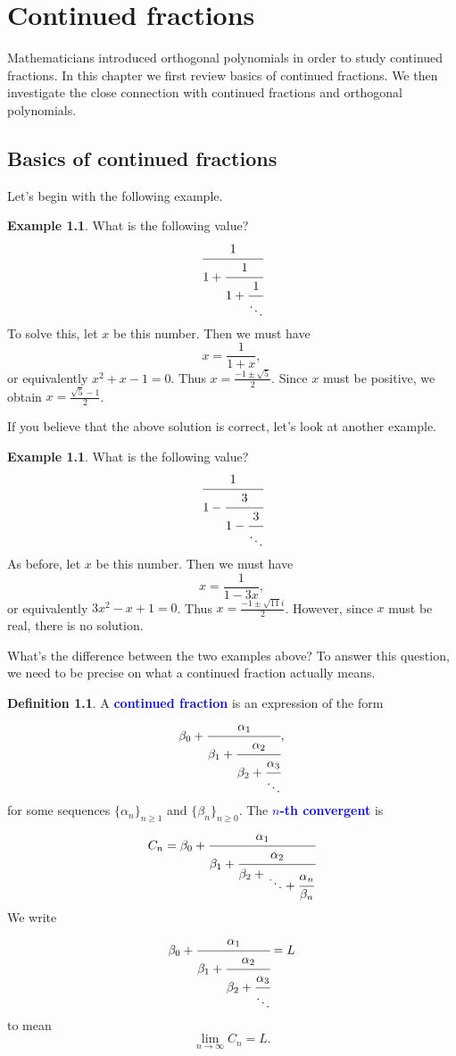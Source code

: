 \documentclass[oneside]{book}
\numberwithin{equation}{section}
\theoremstyle{definition}
\newtheorem{exam}[thm]{Example}
\newtheorem{defn}[thm]{Definition}
\renewcommand\emph[1]{\textcolor{blue}{\bf #1}}
\begin{document}
\chapter{Continued fractions}

Mathematicians introduced orthogonal polynomials in order to study
continued fractions. In this chapter we first review basics of
continued fractions. We then investigate the close connection with
continued fractions and orthogonal polynomials.

\section{Basics of continued fractions}

Let's begin with the following example.

\begin{exam}\label{exa:1}
  What is the following value?
\[
  \cfrac{1}{
    1 + \cfrac{1}{
      1 + \cfrac{1}{\ddots}}}
\]
To solve this, let \( x \) be this number. Then we must have
\[
  x = \frac{1}{1+x},
\]
or equivalently \( x^2+x-1 =0 \). Thus
\( x= \frac{-1\pm \sqrt{5}}{2} \). Since \( x \) must be positive, we
obtain \( x= \frac{\sqrt{5}-1}{2} \).
\end{exam}

If you believe that the above solution is correct, let's look at another example.

\begin{exam}\label{exa:2}
  What is the following value?
\[
  \cfrac{1}{
    1 -\cfrac{3}{
      1 - \cfrac{3}{\ddots}}}
\]
As before, let \( x \) be this number. Then we must have
\[
  x = \frac{1}{1-3x},
\]
or equivalently \( 3x^2-x+1 =0 \). Thus
\( x= \frac{-1\pm \sqrt{11}i}{2} \). However, since \( x \) must be
real, there is no solution.
\end{exam}

What's the difference between the two examples above? To answer this
question, we need to be precise on what a continued fraction actually
means.

\begin{defn}\label{def:8}
  A \emph{continued fraction} is an expression of the form
  \[
   \beta_0+   \cfrac{\alpha_1}{
    \beta_1 +\cfrac{\alpha_2}{
      \beta_2 + \cfrac{\alpha_3}{\ddots}}},
  \]
  for some sequences \( \{ \alpha_n\}_{n\ge 1} \) and
  \( \{ \beta_n\}_{n\ge 0} \). The \emph{\( n \)-th convergent} is
  \[
  C_n=\beta_0+\cfrac{\alpha_1}{
  \beta_1 + \cfrac{\alpha_2}{
    \beta_2 \displaystyle+ \genfrac{}{}{0pt}{0}{}{\ddots + \cfrac{\alpha_n}{\beta_n}}}}
  \]
  We write
  \[
   \beta_0+   \cfrac{\alpha_1}{
    \beta_1 +\cfrac{\alpha_2}{
      \beta_2 + \cfrac{\alpha_3}{\ddots}}} = L
  \]
  to mean
  \[
    \lim_{n\to \infty} C_n = L.
  \]
\end{defn}
\end{document}
